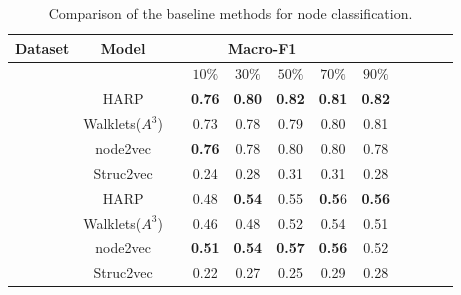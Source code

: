 \documentclass[a4paper,13pt]{article}
\newcommand\Tstrut{\rule{0pt}{3ex}}         %
\begin{document}
 
\begin{table}[H]


\begin{center}
\begin{tabular}{cccc ccc ccc cc}
\hline
\textbf{Dataset}&
\textbf{Model}&
\multicolumn{5}{c}{\textbf{Macro-F1} }&

 \Tstrut\\
  \hline  
\Tstrut

  &  & &  $10\%$  &  $30\%$  & $50\%$ &  $70\%$  &$90\%$\Tstrut\\

 \Tstrut
 \multirow{4}{*}{Cora}& HARP &  & \textbf{0.76}  & \textbf{0.80} &\textbf{0.82} &\textbf{0.81} &\textbf{0.82} \Tstrut\\
    &Walklets($A^3$)& &0.73 & 0.78 & 0.79 & 0.80 & 0.81 &\\
    & node2vec & & \textbf{0.76} & 0.78 & 0.80 & 0.80 & 0.78 & \\
     & Struc2vec & & 0.24 & 0.28 & 0.31 & 0.31 & 0.28\\
      \hline 
      
 \Tstrut
 \multirow{4}{*}{Citeseer}& HARP &  &0.48  &\textbf{0.54} &0.55 &\textbf{0.5}6&\textbf{0.56}\Tstrut\\
    &Walklets($A^3$)&  &  0.46 & 0.48 & 0.52 & 0.54 & 0.51 &\\
    & node2vec & & \textbf{0.51} & \textbf{0.54} & \textbf{0.57} & \textbf{0.56}  & 0.52 &\\
     & Struc2vec & & 0.22   & 0.27  & 0.25  & 0.29  & 0.28 \\
     
   


\hline 
   
\end{tabular}
\label{tab:partial}
\end{center}
\caption{Comparison of the baseline methods for node classification.}
\end{table}
\end{document}

